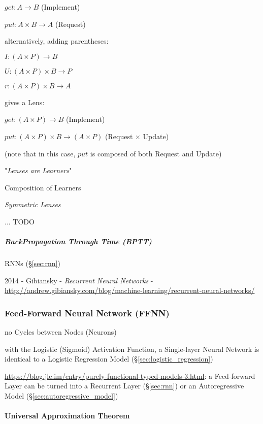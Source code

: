 $get : A \rightarrow B$ (Implement)

$put : A \times B \rightarrow A$ (Request)

alternatively, adding parentheses:

$I : (A \times P) \rightarrow B$

$U : (A \times P) \times B \rightarrow P$

$r : (A \times P) \times B \rightarrow A$

gives a Lens:

$get : (A \times P) \rightarrow B$ (Implement)

$put : (A \times P) \times B \rightarrow (A \times P)$ (Request $\times$ Update)

(note that in this case, $put$ is composed of both Request and Update)

"\emph{Lenses are Learners}"

Composition of Learners

\emph{Symmetric Lenses}

... TODO



\subparagraph{BackPropagation Through Time (BPTT)}\label{sec:bptt}\hfill

RNNs (\S\ref{sec:rnn})

2014 - Gibiansky - \emph{Recurrent Neural Networks} -
\url{http://andrew.gibiansky.com/blog/machine-learning/recurrent-neural-networks/}



\subsubsection{Feed-Forward Neural Network (FFNN)}\label{sec:ffnn}

no Cycles between Nodes (Neurons)

with the Logistic (Sigmoid) Activation Function, a Single-layer Neural Network
is identical to a Logistic Regression Model (\S\ref{sec:logistic_regression})

\url{https://blog.jle.im/entry/purely-functional-typed-models-3.html}: a
Feed-forward Layer can be turned into a Recurrent Layer (\S\ref{sec:rnn}) or an
Autoregressive Model (\S\ref{sec:autoregressive_model})



\paragraph{Universal Approximation Theorem}
\label{sec:universal_approximation}\hfill

